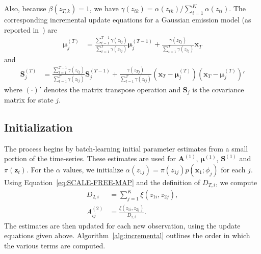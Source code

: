 \documentclass[12pt]{article}
\makeatletter
\def\BState{\State\hskip-\ALG@thistlm}
\makeatother
\begin{document}
Also, because $\beta(z_{T,k}) = 1$, we have $\gamma(z_{tk}) = \alpha(z_{tk}) / \sum_{i=1}^{K}\alpha(z_{ti})$. The corresponding incremental update equations for a Gaussian emission model (as reported in~\cite{stenger2001}) are 
\begin{align*}
    \mathbf{\mu}_{j}^{(T)} &= \frac{\sum_{t=1}^{T-1}\gamma(z_{tj})}{\sum_{t=1}^{T}\gamma(z_{tj})}\mathbf{\mu}_{j}^{(T-1)} + \frac{\gamma(z_{Tj})}{\sum_{t=1}^{T}\gamma(z_{tj})}\mathbf{x}_T
\end{align*}
and
\begin{align*}
    \mathbf{S}_j^{(T)} &= \frac{\sum_{t=1}^{T-1}\gamma(z_{tj})}{\sum_{t=1}^{T}\gamma(z_{tj})}\mathbf{S}_j^{(T-1)} + \frac{\gamma(z_{Tj})}{\sum_{t=1}^{T}\gamma(z_{tj})}\left(\mathbf{x}_T - \mathbf{\mu}_j^{(T)}\right)\left(\mathbf{x}_T - \mathbf{\mu}_j^{(T)}\right)'
\end{align*}
where $(\cdot)'$ denotes the matrix transpose operation and $\mathbf{S}_j$ is the covariance matrix for state $j$.

\subsection{Initialization}

The process begins by batch-learning initial parameter estimates from a small portion of the time-series. These estimates are used for $\mathbf{A}^{(1)}$, $\mathbf{\mu}^{(1)}$, $\mathbf{S}^{(1)}$ and $\pi(\mathbf{z}_t)$. For the $\alpha$ values, we initialize $\alpha(z_{1j}) = \pi(z_{1j})p(\mathbf{x}_1; \phi_j)$ for each $j$. Using Equation~\ref{eq:SCALE-FREE-MAP} and the definition of $D_{T,i}$, we compute
\begin{align*}
    D_{2,i} &= \sum_{j=1}^{K} \xi(z_{1i}, z_{2j}), \\
    A_{ij}^{(2)} &= \frac{\xi(z_{1i}, z_{2j})}{D_{2,i}}.
\end{align*}
The estimates are then updated for each new observation, using the update equations given above. Algorithm~\ref{alg:incremental} outlines the order in which the various terms are computed.

\begin{algorithm}
\caption{}
\label{alg:incremental}
\end{algorithm}
\end{document}
